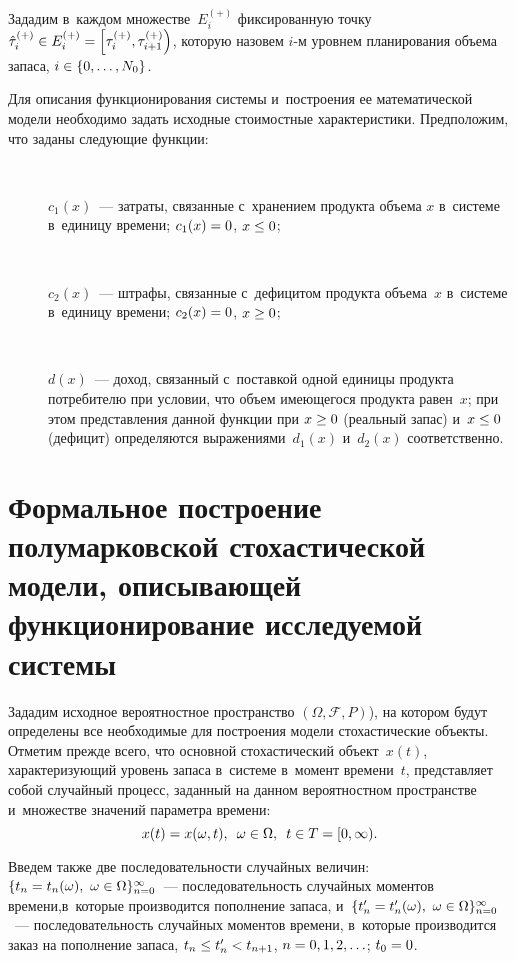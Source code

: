 \begin{multicols}{2}
  Зададим в~каждом множестве~$E_i^{(+)}$ фиксированную точку 
$\hat{\tau}_i^{(+)}\hm\in E_i^{(+)}=\left[ \tau_i^{(+)}, \tau^{(+)}_{i+1}\right)$, 
которую назовем $i$-м уровнем планирования объема запаса, $i\hm\in \{0,\ldots 
, N_0\}$.
  
  Для описания функционирования системы и~построения ее 
математической модели необходимо задать исходные стоимостные 
характеристики. Предположим, что заданы следующие функции:
  \begin{description}
  \item[\,]
  $c_1(x)$~--- затраты, связанные с~хранением продукта объема $x$   в~системе 
в~единицу времени; $c_1(x)\hm=0$, $x\hm\leq 0$;
  \item[\,] $c_2(x)$~--- штрафы, связанные с~дефицитом продукта 
объема~$x$ в~системе в~единицу времени; $c_2(x)\hm=0$, $x\hm\geq 0$;
  \item[\,]
  $d(x)$~--- доход, связанный с~поставкой одной единицы продукта 
потребителю при условии, что объем имеющегося продукта равен~$x$; при 
этом представления данной функции при $x\hm\geq 0$ (реальный запас) 
и~$x\hm\leq 0$ (дефицит) определяются выражениями~$d_1(x)$ и~$d_2(x)$ 
соответственно.
  \end{description}
  
\section{Формальное построение полумарковской стохастической 
модели, описывающей функционирование исследуемой системы}

  Зададим исходное вероятностное пространство $(\Omega,\mathcal{F}, P)$), на 
котором будут определены все необходимые для построения модели 
стохастические объекты. Отметим прежде всего, что основной стохастический 
объект~$x(t)$, характеризующий уровень запаса в~системе в~момент 
времени~$t$, представляет собой случайный процесс, заданный на данном 
вероятностном пространстве и~множестве значений параметра времени: 
  $$
  x(t)=x(\omega,t),\enskip \omega\in \Omega,\enskip t\in T= [0,\infty).
  $$ 
  
  Введем также две последовательности случайных величин: $\{t_n\hm= 
t_n(\omega),\ \omega\hm\in \Omega\}^\infty_{n=0}$~--- последовательность 
случайных моментов времени,\linebreak в~которые производится пополнение запаса, 
и~$\{t_n^\prime\hm= t^{\prime}_n (\omega),\ \omega\hm\in \Omega\}^\infty_{n=0}$~--- 
последовательность случайных моментов времени, в~которые производится 
заказ на пополнение запаса, $t_n\hm\leq t_n^\prime\hm< t_{n+1}$, $n\hm= 
0,1,2,\ldots$; $t_0\hm=0$. 


\end{multicols}
